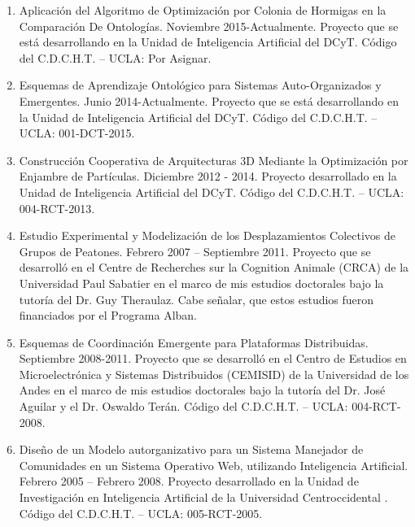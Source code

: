 \begin{enumerate}

\item Aplicación del Algoritmo de Optimización por Colonia de
Hormigas en la Comparación De Ontologías. Noviembre 2015-Actualmente. Proyecto
que se está desarrollando en la Unidad de Inteligencia Artificial del DCyT.
Código del C.D.C.H.T. – UCLA: Por Asignar.

\item Esquemas de Aprendizaje Ontológico para Sistemas Auto-Organizados y
Emergentes. Junio 2014-Actualmente. Proyecto que se está desarrollando en la
Unidad de Inteligencia Artificial del DCyT. Código del C.D.C.H.T. – UCLA:
001-DCT-2015.

\item Construcción Cooperativa de Arquitecturas 3D Mediante la Optimización por
Enjambre de Partículas. Diciembre 2012 - 2014. Proyecto desarrollado en la
Unidad de Inteligencia Artificial del DCyT. Código del C.D.C.H.T. – UCLA:
004-RCT-2013.

\item Estudio Experimental y Modelización de los Desplazamientos Colectivos de
Grupos de Peatones. Febrero 2007 – Septiembre 2011. Proyecto que se desarrolló
en el Centre de Recherches sur la Cognition Animale (CRCA) de la Universidad
Paul Sabatier en el marco de mis estudios doctorales bajo la tutoría del Dr. Guy
Theraulaz. Cabe señalar, que estos estudios fueron financiados por el Programa
Alban.

\item Esquemas de Coordinación Emergente para Plataformas Distribuidas.
Septiembre 2008-2011. Proyecto que se desarrolló en el Centro de Estudios en
Microelectrónica y Sistemas Distribuidos (CEMISID) de la Universidad de los
Andes en el marco de mis estudios doctorales bajo la tutoría del Dr. José
Aguilar y el Dr. Oswaldo Terán. Código del C.D.C.H.T. – UCLA: 004-RCT-2008.

\item Diseño de un Modelo autorganizativo para un Sistema Manejador de
Comunidades en un Sistema Operativo Web, utilizando Inteligencia Artificial.
Febrero 2005 – Febrero 2008. Proyecto desarrollado en la Unidad de Investigación
en Inteligencia Artificial de la Universidad Centroccidental . Código del C.D.C.H.T. – UCLA: 005-RCT-2005.

\end{enumerate}

\espaciotriple


